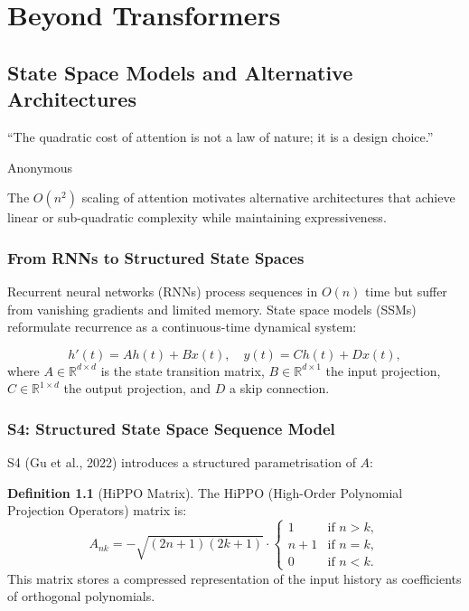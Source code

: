 \documentclass[11pt,a4paper]{book}
\theoremstyle{definition}
\newtheorem{definition}{Definition}[chapter]
\begin{document}
\part{Beyond Transformers}

\chapter{State Space Models and Alternative Architectures}
\label{ch:ssm}

\epigraph{``The quadratic cost of attention is not a law of nature; it is a design choice.''}{Anonymous}

The $O(n^2)$ scaling of attention motivates alternative architectures that achieve linear or sub-quadratic complexity while maintaining expressiveness.

\section{From RNNs to Structured State Spaces}

Recurrent neural networks (RNNs) process sequences in $O(n)$ time but suffer from vanishing gradients and limited memory. State space models (SSMs) reformulate recurrence as a continuous-time dynamical system:

\begin{equation}
	h'(t) = A h(t) + B x(t), \quad y(t) = C h(t) + D x(t),
\end{equation}
where $A \in \mathbb{R}^{d \times d}$ is the state transition matrix, $B \in \mathbb{R}^{d \times 1}$ the input projection, $C \in \mathbb{R}^{1 \times d}$ the output projection, and $D$ a skip connection.

\section{S4: Structured State Space Sequence Model}

S4 (Gu et al., 2022) introduces a structured parametrisation of $A$:

\begin{definition}[HiPPO Matrix]
	The HiPPO (High-Order Polynomial Projection Operators) matrix is:
	\begin{equation}
		A_{nk} = -\sqrt{(2n+1)(2k+1)} \cdot \begin{cases}
			1   & \text{if } n > k, \\
			n+1 & \text{if } n = k, \\
			0   & \text{if } n < k.
		\end{cases}
	\end{equation}
	This matrix stores a compressed representation of the input history as coefficients of orthogonal polynomials.
\end{definition}
\end{document}
